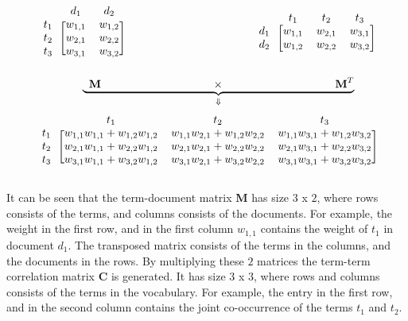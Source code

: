 \begin{samepage}
\[
  \begin{blockarray}{ccc}
    & d_1 & d_2 \\
    \begin{block}{l[cc]}
      t_1 & w_{1, 1} & w_{1, 2} \\
      t_2 & w_{2, 1} & w_{2, 2} \\
      t_3 & w_{3, 1} & w_{3, 2} \\
    \end{block}
  \end{blockarray}
  \hspace{40mm}
  \begin{blockarray}{cccc}
    & t_1 & t_2 & t_3 \\
    \begin{block}{l[ccc]}
      d_1 & w_{1, 1} & w_{2, 1} & w_{3, 1} \\
      d_2 & w_{1, 2} & w_{2, 2} & w_{3, 2} \\
    \end{block}
  \end{blockarray}
    \vspace*{-7mm}
\]
\[
  \hspace{8mm}
  \underbrace{\hspace{2mm}\textbf{M}\hspace{35mm}\times\hspace{35mm}\textbf{M}^{T}}_{\Downarrow} \\
\]
\[
  \begin{blockarray}{cccc}
    & t_1 & t_2 & t_3 \\
    \begin{block}{l[ccc]}
      t_1 & w_{1, 1}w_{1, 1} + w_{1, 2}w_{1, 2} & w_{1, 1}w_{2, 1} + w_{1, 2}w_{2, 2} & w_{1, 1}w_{3, 1} + w_{1, 2}w_{3, 2} \\
      t_2 & w_{2, 1}w_{1, 1} + w_{2, 2}w_{1, 2} & w_{2, 1}w_{2, 1} + w_{2, 2}w_{2, 2} & w_{2, 1}w_{3, 1} + w_{2, 2}w_{3, 2} \\
      t_3 & w_{3, 1}w_{1, 1} + w_{3, 2}w_{1, 2} & w_{3, 1}w_{2, 1} + w_{3, 2}w_{2, 2} & w_{3, 1}w_{3, 1} + w_{3, 2}w_{3, 2} \\
    \end{block}
  \end{blockarray}
\]
\end{samepage}
It can be seen that the term-document matrix \textbf{M} has size $3$ x $2$, where rows consists of the terms, and columns consists of the documents. For example, the weight in the first row, and in the first column $w_{1, 1}$ contains the weight of $t_1$ in document $d_1$. The transposed matrix consists of the terms in the columns, and the documents in the rows. By multiplying these $2$ matrices the term-term correlation matrix \textbf{C} is generated. It has size $3$ x $3$, where rows and columns consists of the terms in the vocabulary. For example, the entry in the first row, and in the second column contains the joint co-occurrence of the terms $t_1$ and $t_2$.

